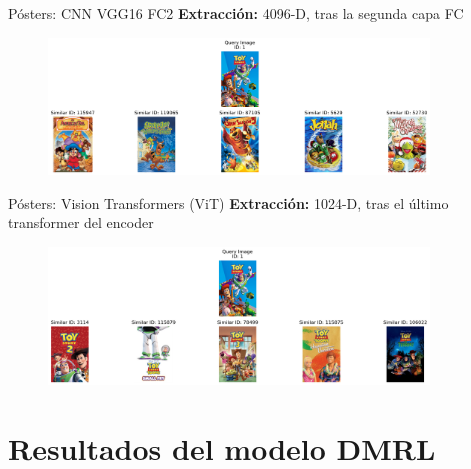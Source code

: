 \documentclass{beamer}
\begin{document}
\begin{frame}{Pósters: CNN VGG16 FC2}
    \textbf{Extracción:} 4096-D, tras la segunda capa FC

    \begin{figure}
        \centering
        \includegraphics[width=0.9\textwidth]{images/vgg16_fc2_nopca.png}
    \end{figure}
\end{frame}

\begin{frame}{Pósters: Vision Transformers (ViT)}
    \textbf{Extracción:} 1024-D, tras el último transformer del encoder

    \begin{figure}
        \centering
        \includegraphics[width=0.9\textwidth]{images/vit_h14.png}
    \end{figure}
\end{frame}

\section*{Resultados del modelo DMRL}
\end{document}
